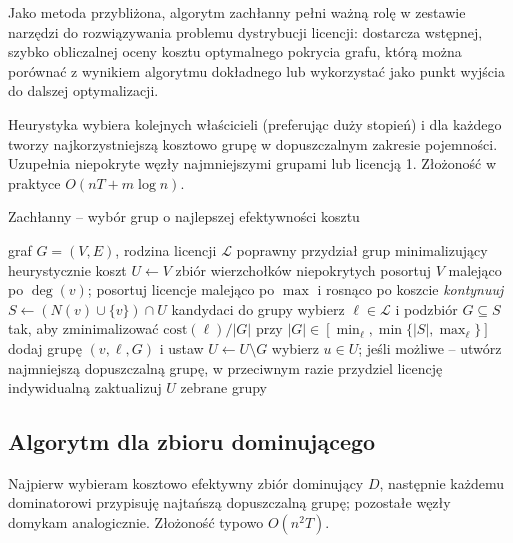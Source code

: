 Jako metoda przybliżona, algorytm zachłanny pełni ważną rolę w zestawie narzędzi do rozwiązywania problemu dystrybucji licencji: dostarcza wstępnej, szybko obliczalnej oceny kosztu optymalnego pokrycia grafu, którą można porównać z wynikiem algorytmu dokładnego lub wykorzystać jako punkt wyjścia do dalszej optymalizacji.

Heurystyka wybiera kolejnych właścicieli (preferując duży stopień) i dla każdego tworzy najkorzystniejszą kosztowo grupę w dopuszczalnym zakresie pojemności. Uzupełnia niepokryte węzły najmniejszymi grupami lub licencją 1. Złożoność w praktyce $O(nT + m\log n)$.

\begin{algorithm}[H]
\caption{Zachłanny – wybór grup o najlepszej efektywności kosztu}
\label{alg:greedy}
\begin{algorithmic}[1]
\Require graf $G=(V,E)$, rodzina licencji $\mathcal{L}$
\Ensure poprawny przydział grup minimalizujący heurystycznie koszt
\State $U \gets V$ \Comment zbiór wierzchołków niepokrytych
\State posortuj $V$ malejąco po $\deg(v)$; posortuj licencje malejąco po $\max$ i rosnąco po koszcie
   \State \textit{kontynuuj} \EndIf
  \State $S \gets (N(v)\cup\{v\})\cap U$ \Comment kandydaci do grupy
  \State wybierz $\ell\in\mathcal{L}$ i podzbiór $G\subseteq S$ tak, aby zminimalizować $\mathrm{cost}(\ell)/|G|$ przy $|G|\in[\min_\ell,\min\{|S|,\max_\ell\}]$
    \State dodaj grupę $(v,\ell,G)$ i ustaw $U\gets U\setminus G$
  \EndIf
\EndFor
{}
  \State wybierz $u\in U$; jeśli możliwe – utwórz najmniejszą dopuszczalną grupę, w przeciwnym razie przydziel licencję indywidualną
  \State zaktualizuj $U$
\EndWhile
\State \Return zebrane grupy
\end{algorithmic}
\end{algorithm}

\subsection{Algorytm dla zbioru dominującego}

Najpierw wybieram kosztowo efektywny zbiór dominujący $D$, następnie każdemu dominatorowi przypisuję najtańszą dopuszczalną grupę; pozostałe węzły domykam analogicznie. Złożoność typowo $O(n^2T)$.

